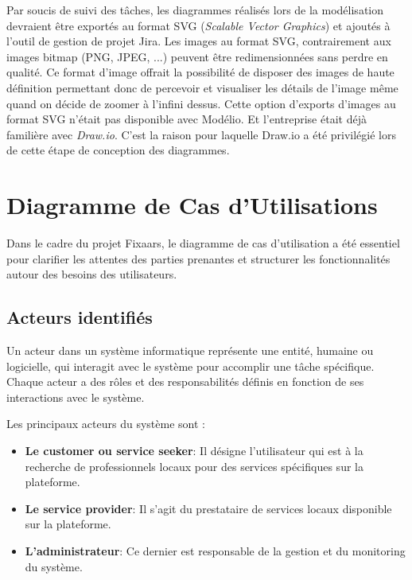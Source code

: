 {\vspace{0.35cm}

Par soucis de suivi des tâches, les diagrammes réalisés lors de la modélisation devraient être exportés au format SVG (\textit{Scalable Vector Graphics}) et ajoutés à l'outil de gestion de projet Jira. Les images au format SVG, contrairement aux images bitmap (PNG, JPEG, ...) peuvent être redimensionnées sans perdre en qualité. Ce format d'image offrait la possibilité de disposer des images de haute définition permettant donc de percevoir et visualiser les détails de l'image même quand on décide de zoomer à l'infini dessus. Cette option d'exports d'images au format SVG n'était pas disponible avec Modélio. Et l'entreprise était déjà familière avec \textit{Draw.io}. C'est la raison pour laquelle Draw.io a été privilégié lors de cette étape de conception des diagrammes.

\section{Diagramme de Cas d'Utilisations}
Dans le cadre du projet Fixaars, le diagramme de cas d'utilisation a été essentiel pour clarifier les attentes des parties prenantes et structurer les fonctionnalités autour des besoins des utilisateurs.

\subsection{Acteurs identifiés}
Un acteur dans un système informatique représente une entité, humaine ou logicielle, qui interagit avec le système pour accomplir une tâche spécifique. Chaque acteur a des rôles et des responsabilités définis en fonction de ses interactions avec le système. 

\vspace{0.39cm}

Les principaux acteurs du système sont : 

\vspace{0.39cm}

\begin{itemize}
    \item \textbf{Le customer ou service seeker}: Il désigne l'utilisateur qui est à la recherche de professionnels locaux pour des services spécifiques sur la plateforme. 
    \item \textbf{Le service provider}: Il s'agit du prestataire de services locaux disponible sur la plateforme.
    \item \textbf{L'administrateur}: Ce dernier est responsable de la gestion et du monitoring du système.
\end{itemize}

}

